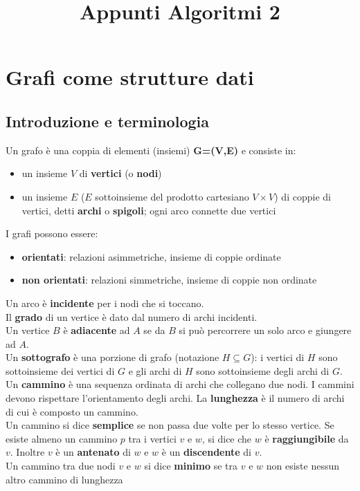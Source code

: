 \documentclass[11pt]{article}
\title{Appunti Algoritmi 2}
\theoremstyle{proprietà}
\begin{document}
\tableofcontents
\listofalgorithms
\newpage
{}
\section{Grafi come strutture dati}
\subsection{Introduzione e terminologia}
Un grafo è una coppia di elementi (insiemi) \textbf{G=(V,E)} e consiste in:
\begin{itemize}
    \item un insieme $V$ di \textbf{vertici} (o \textbf{nodi})
    \item un insieme $E$ ($E$ sottoinsieme del prodotto cartesiano $V\times V$) di coppie di vertici, detti \textbf{archi}
    o \textbf{spigoli}; ogni arco connette due vertici
\end{itemize}
I grafi possono essere:
\begin{itemize}
    \item \textbf{orientati}: relazioni asimmetriche, insieme di coppie ordinate
    \item \textbf{non orientati}: relazioni simmetriche, insieme di coppie non ordinate
\end{itemize}
Un arco è \textbf{incidente} per i nodi che si toccano.\\
Il \textbf{grado} di un vertice è dato dal numero di archi incidenti.\\
Un vertice $B$ è \textbf{adiacente} ad $A$ se da $B$ si può percorrere un solo arco e giungere ad $A$.\\
Un \textbf{sottografo} è una porzione di grafo (notazione $H\subseteq G$): i vertici di $H$ sono sottoinsieme dei vertici di $G$ 
e gli archi di $H$ sono sottoinsieme degli archi di $G$.\\
Un \textbf{cammino} è una sequenza ordinata di archi che collegano due nodi. I cammini devono rispettare l'orientamento 
degli archi. La \textbf{lunghezza} è il numero di archi di cui è composto un cammino.\\ Un cammino si dice \textbf{semplice} 
se non passa due volte per lo stesso vertice. Se esiste almeno un cammino $p$ tra i vertici $v$ e $w$, si dice che $w$ è 
\textbf{raggiungibile} da $v$. Inoltre $v$ è un \textbf{antenato} di $w$ e $w$ è un \textbf{discendente} di $v$.\\ 
Un cammino tra due nodi $v$ e $w$ si dice \textbf{minimo} se tra $v$ e $w$ non esiste nessun altro cammino di lunghezza 
\end{document}
